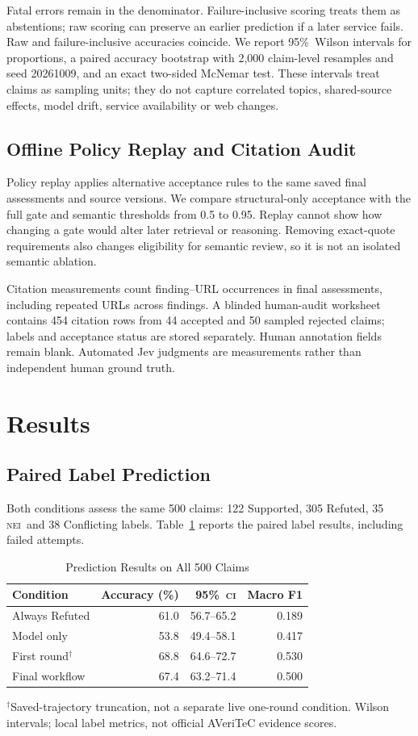 \documentclass[conference]{IEEEtran}
\newcommand{\NEI}{\textsc{nei}}
\newcommand{\CI}{\textsc{ci}}
\newcommand{\pct}{\%}
\begin{document}
Fatal errors remain in the denominator. Failure-inclusive scoring treats them as abstentions; raw scoring can preserve an earlier prediction if a later service fails. Raw and failure-inclusive accuracies coincide. We report 95\pct\ Wilson intervals for proportions, a paired accuracy bootstrap with 2,000 claim-level resamples and seed 20261009, and an exact two-sided McNemar test. These intervals treat claims as sampling units; they do not capture correlated topics, shared-source effects, model drift, service availability or web changes.

\subsection{Offline Policy Replay and Citation Audit}
Policy replay applies alternative acceptance rules to the same saved final assessments and source versions. We compare structural-only acceptance with the full gate and semantic thresholds from 0.5 to 0.95. Replay cannot show how changing a gate would alter later retrieval or reasoning. Removing exact-quote requirements also changes eligibility for semantic review, so it is not an isolated semantic ablation.

Citation measurements count finding--URL occurrences in final assessments, including repeated URLs across findings. A blinded human-audit worksheet contains 454 citation rows from 44 accepted and 50 sampled rejected claims; labels and acceptance status are stored separately. Human annotation fields remain blank. Automated Jev judgments are measurements rather than independent human ground truth.

\section{Results}
\subsection{Paired Label Prediction}
Both conditions assess the same 500 claims: 122 Supported, 305 Refuted, 35 \NEI\ and 38 Conflicting labels. Table~\ref{tab:prediction} reports the paired label results, including failed attempts.

\begin{table}[t]
\caption{Prediction Results on All 500 Claims}
\label{tab:prediction}
\centering
\footnotesize
\begin{tabular}{@{}lrrr@{}}
\toprule
Condition & Accuracy (\pct) & 95\pct\ \CI & Macro F1\\
\midrule
Always Refuted & 61.0 & 56.7--65.2 & 0.189\\
Model only & 53.8 & 49.4--58.1 & 0.417\\
First round$^{\dagger}$ & 68.8 & 64.6--72.7 & 0.530\\
Final workflow & 67.4 & 63.2--71.4 & 0.500\\
\bottomrule
\end{tabular}
\par\smallskip
\parbox{\columnwidth}{\footnotesize $^{\dagger}$Saved-trajectory truncation, not a separate live one-round condition. Wilson intervals; local label metrics, not official AVeriTeC evidence scores.}
\end{table}
\end{document}
